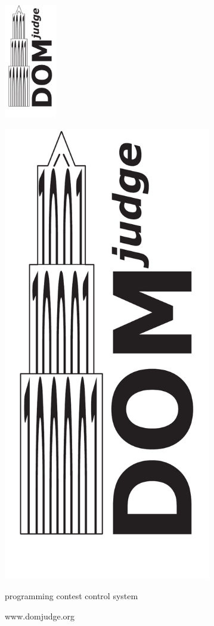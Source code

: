 \documentclass[a4paper]{article}
\begin{document}
\vspace*{2cm}
\hspace{14cm}
\includegraphics[height=5cm]{DOMjudgelogo}

\newpage

\begin{center}
  \vspace*{4cm}

  \includegraphics[height=20cm]{DOMjudgelogo}
  \vspace{-1cm}

  \fontsize{1.1cm}{1cm}\selectfont
  \sffamily\bfseries

  programming contest control system

  \vspace{0.8cm}

  www.domjudge.org
\end{center}
\end{document}
